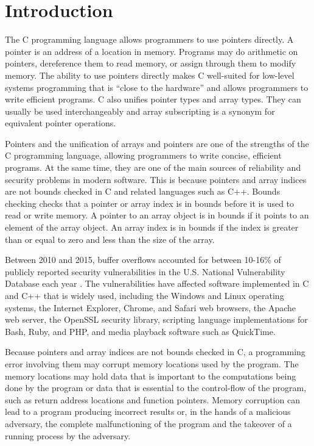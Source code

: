 
\chapter{Introduction}\label{introduction}

The C programming language \cite{Ritchie1988, ISO2011} allows programmers to use 
pointers directly. A pointer is an address of a location in memory. Programs may do
arithmetic on pointers, dereference them to read memory, or assign
through them to modify memory. The ability to use pointers directly
makes C well-suited for low-level systems programming that is ``close to
the hardware'' and allows programmers to write efficient programs. C
also unifies pointer types and array types. They can usually be used
interchangeably and array subscripting is a synonym for equivalent
pointer operations.

Pointers and the unification of arrays and pointers are one of the
strengths of the C programming language, allowing programmers to write
concise, efficient programs. At the same time, they are one of the main
sources of reliability and security problems in modern software. This is
because pointers and array indices are not bounds checked in C and
related languages such as C++. Bounds checking checks that a pointer or
array index is in bounds before it is used to read or write memory. A
pointer to an array object is in bounds if it points to an element of
the array object. An array index is in bounds if the index is greater
than or equal to zero and less than the size of the array.

Between 2010 and 2015, buffer overflows accounted for between 10-16\% of
publicly reported security vulnerabilities in the U.S. National
Vulnerability Database each year \cite{NIST2015}. The vulnerabilities have affected
software implemented in C and C++ that is widely used, including the
Windows and Linux operating systems, the Internet Explorer, Chrome, and
Safari web browsers, the Apache web server, the OpenSSL security
library, scripting language implementations for Bash, Ruby, and PHP, and
media playback software such as QuickTime.

Because pointers and array indices are not bounds checked in C, a
programming error involving them may corrupt memory locations used by
the program. The memory locations may hold data that is important to the
computations being done by the program or data that is essential to the
control-flow of the program, such as return address locations and
function pointers. Memory corruption can lead to a program producing
incorrect results or, in the hands of a malicious adversary, the
complete malfunctioning of the program and the takeover of a running
process by the adversary.

